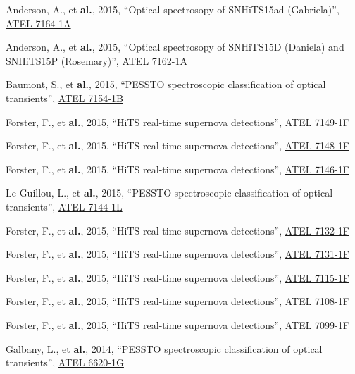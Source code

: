 \documentclass[12pt]{article}
\begin{document}
\begin{bibenum}
    \item Anderson, A., et \textbf{al.}, 2015, ``Optical spectrosopy of SNHiTS15ad (Gabriela)'', \href{http://adsabs.harvard.edu/abs/2015ATel.7164....1A}{ATEL 7164-1A}
    \item Anderson, A., et \textbf{al.}, 2015, ``Optical spectrosopy of SNHiTS15D (Daniela) and SNHiTS15P (Rosemary)'', \href{http://adsabs.harvard.edu/abs/2015ATel.7162....1A}{ATEL 7162-1A}
    \item Baumont, S., et \textbf{al.}, 2015, ``PESSTO spectroscopic classification of optical transients'', \href{http://adsabs.harvard.edu/abs/2015ATel.7154....1B}{ATEL 7154-1B}
    \item Forster, F., et \textbf{al.}, 2015, ``HiTS real-time supernova detections'', \href{http://adsabs.harvard.edu/abs/2015ATel.7149....1F}{ATEL 7149-1F}
    \item Forster, F., et \textbf{al.}, 2015, ``HiTS real-time supernova detections'', \href{http://adsabs.harvard.edu/abs/2015ATel.7148....1F}{ATEL 7148-1F}
    \item Forster, F., et \textbf{al.}, 2015, ``HiTS real-time supernova detections'', \href{http://adsabs.harvard.edu/abs/2015ATel.7146....1F}{ATEL 7146-1F}
    \item Le Guillou, L., et \textbf{al.}, 2015, ``PESSTO spectroscopic classification of optical transients'', \href{http://adsabs.harvard.edu/abs/2015ATel.7144....1F}{ATEL 7144-1L}
    \item Forster, F., et \textbf{al.}, 2015, ``HiTS real-time supernova detections'', \href{http://adsabs.harvard.edu/abs/2015ATel.7132....1F}{ATEL 7132-1F}
    \item Forster, F., et \textbf{al.}, 2015, ``HiTS real-time supernova detections'', \href{http://adsabs.harvard.edu/abs/2015ATel.7131....1F}{ATEL 7131-1F}
    \item Forster, F., et \textbf{al.}, 2015, ``HiTS real-time supernova detections'', \href{http://adsabs.harvard.edu/abs/2015ATel.7115....1F}{ATEL 7115-1F}
    \item Forster, F., et \textbf{al.}, 2015, ``HiTS real-time supernova detections'', \href{http://adsabs.harvard.edu/abs/2015ATel.7108....1F}{ATEL 7108-1F}
    \item Forster, F., et \textbf{al.}, 2015, ``HiTS real-time supernova detections'', \href{http://adsabs.harvard.edu/abs/2015ATel.7099....1F}{ATEL 7099-1F}
    \item Galbany, L., et \textbf{al.}, 2014, ``PESSTO spectroscopic classification of optical transients'', \href{http://adsabs.harvard.edu/abs/2014ATel.6620....1G}{ATEL 6620-1G}

\end{bibenum}
\end{document}
